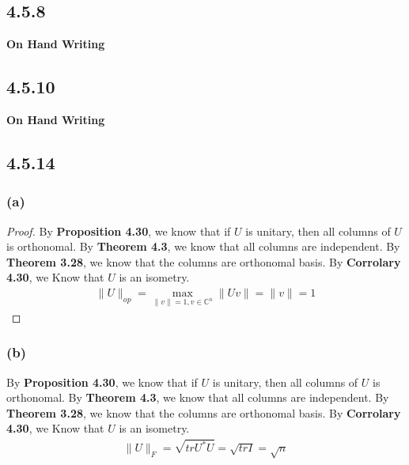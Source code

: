 \documentclass{article}
\newtheorem*{proof}{Proof}
\begin{document}
\subsection*{4.5.8}
\textbf{On Hand Writing}
\subsection*{4.5.10}
\textbf{On Hand Writing}

\subsection*{4.5.14}
\subsubsection*{(a)}
\begin{proof}
    By \textbf{Proposition 4.30}, we know that if $U$ is unitary, then all columns of $U$ is orthonomal. By \textbf{Theorem 4.3}, we know that all columns are independent. 
    By \textbf{Theorem 3.28}, we know that the columns are orthonomal basis. By \textbf{Corrolary 4.30}, we Know that $U$ is an isometry.
    \begin{equation*}
        \begin{split}
            \|U\|_{op} = \mathop{max} \limits _ {\|v\| = 1, v \in \mathbb{C}^n} \|Uv\| = \|v\| = 1
        \end{split}
    \end{equation*}
\end{proof}

\subsubsection*{(b)}
By \textbf{Proposition 4.30}, we know that if $U$ is unitary, then all columns of $U$ is orthonomal. By \textbf{Theorem 4.3}, we know that all columns are independent. 
By \textbf{Theorem 3.28}, we know that the columns are orthonomal basis. By \textbf{Corrolary 4.30}, we Know that $U$ is an isometry.
\begin{equation*}
    \begin{split}
        \|U\|_F = \sqrt{trU^*U }= \sqrt{trI} = \sqrt{n}
    \end{split}
\end{equation*}
\end{document}
